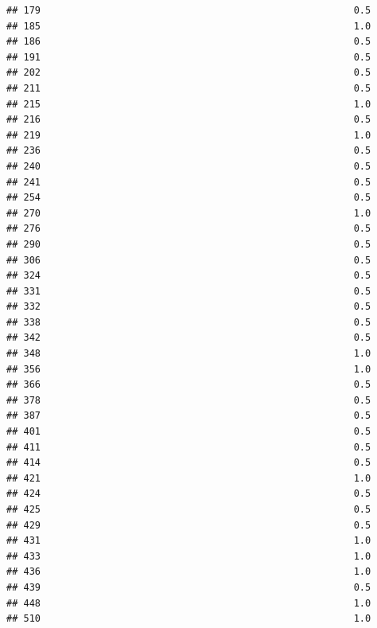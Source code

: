 \documentclass[
]{article}
\begin{document}
\begin{verbatim}
## 179                                                       0.5
## 185                                                       1.0
## 186                                                       0.5
## 191                                                       0.5
## 202                                                       0.5
## 211                                                       0.5
## 215                                                       1.0
## 216                                                       0.5
## 219                                                       1.0
## 236                                                       0.5
## 240                                                       0.5
## 241                                                       0.5
## 254                                                       0.5
## 270                                                       1.0
## 276                                                       0.5
## 290                                                       0.5
## 306                                                       0.5
## 324                                                       0.5
## 331                                                       0.5
## 332                                                       0.5
## 338                                                       0.5
## 342                                                       0.5
## 348                                                       1.0
## 356                                                       1.0
## 366                                                       0.5
## 378                                                       0.5
## 387                                                       0.5
## 401                                                       0.5
## 411                                                       0.5
## 414                                                       0.5
## 421                                                       1.0
## 424                                                       0.5
## 425                                                       0.5
## 429                                                       0.5
## 431                                                       1.0
## 433                                                       1.0
## 436                                                       1.0
## 439                                                       0.5
## 448                                                       1.0
## 510                                                       1.0

\end{verbatim}
\end{document}
